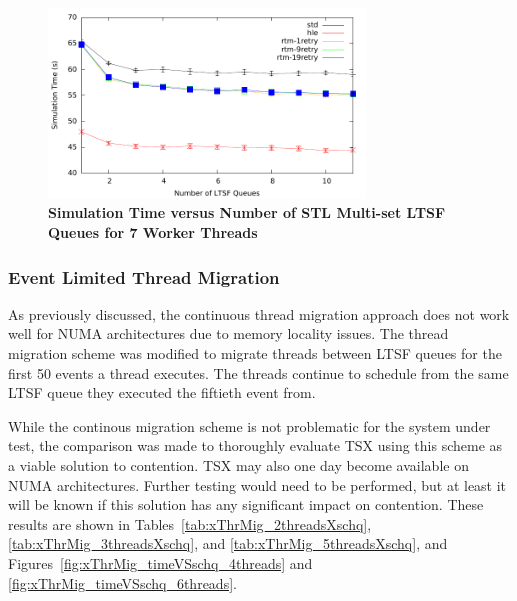 \documentclass[11pt]{book}
\begin{document}
\begin{figure}
    \centering
    \graphicspath{ {./figures/} }
    \includegraphics[width=0.75\textwidth,keepaspectratio]{hugeepidemicsim-CONTmig-timeVSschedQs-multiset-7thread}
    \caption{\textbf{Simulation Time versus Number of STL Multi-set LTSF Queues for 7
        Worker Threads}}\label{fig:contThrMig_timeVSschq_7threads}
\end{figure}

\subsubsection{Event Limited Thread Migration}


As previously discussed, the continuous thread migration approach does not work well for
NUMA architectures due to memory locality issues.  The thread migration scheme was
modified to migrate threads between LTSF queues for the first 50 events a thread executes.
The threads continue to schedule from the same LTSF queue they executed the fiftieth event
from.

While the continous migration scheme is not problematic for the system under test, the
comparison was made to thoroughly evaluate TSX using this scheme as a viable solution to
contention.  TSX may also one day become available on NUMA architectures.  Further testing
would need to be performed, but at least it will be known if this solution has any
significant impact on contention.  These results are shown in
Tables~\ref{tab:xThrMig_2threadsXschq}, \ref{tab:xThrMig_3threadsXschq}, and
\ref{tab:xThrMig_5threadsXschq}, and Figures~\ref{fig:xThrMig_timeVSschq_4threads} and
\ref{fig:xThrMig_timeVSschq_6threads}.
\end{document}
